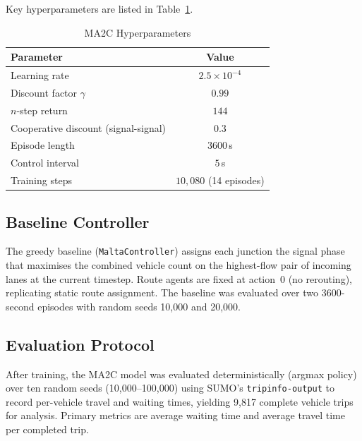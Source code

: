 \documentclass[conference]{IEEEtran}
\begin{document}
Key hyperparameters are listed in Table~\ref{tab:hyperparams}.

\begin{table}[h]
\caption{MA2C Hyperparameters}
\label{tab:hyperparams}
\centering
\renewcommand{\arraystretch}{1.2}
\begin{tabular}{lc}
\toprule
\textbf{Parameter} & \textbf{Value} \\
\midrule
Learning rate                          & $2.5 \times 10^{-4}$ \\
Discount factor $\gamma$               & $0.99$ \\
$n$-step return                        & $144$ \\
Cooperative discount (signal-signal)   & $0.3$ \\
Episode length                         & $3600$\,s \\
Control interval                       & $5$\,s \\
Training steps                         & $10{,}080$ (14 episodes) \\
\bottomrule
\end{tabular}
\end{table}

\subsection{Baseline Controller}

The greedy baseline (\texttt{MaltaController}) assigns each junction the signal
phase that maximises the combined vehicle count on the highest-flow pair of
incoming lanes at the current timestep. Route agents are fixed at action~0
(no rerouting), replicating static route assignment. The baseline was evaluated
over two 3600-second episodes with random seeds 10{,}000 and 20{,}000.

\subsection{Evaluation Protocol}

After training, the MA2C model was evaluated deterministically (argmax policy)
over ten random seeds (10{,}000--100{,}000) using SUMO's
\texttt{tripinfo-output} to record per-vehicle travel and waiting times,
yielding 9{,}817 complete vehicle trips for analysis. Primary metrics are
average waiting time and average travel time per completed trip.

\end{document}
